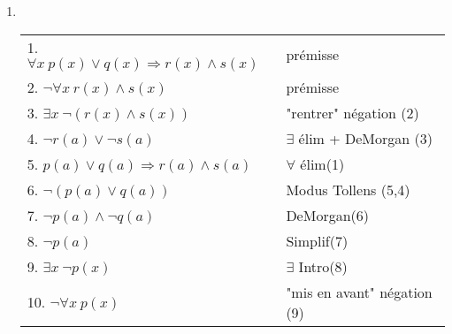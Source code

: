 {\begin{enumerate}
        \item \hspace{1pt}\\
            \begin{tabular}{|l|l|}
            \hline
            1. $ \forall x \ p(x) \lor q(x) \Rightarrow r(x) \land s(x) $ & prémisse \\
            2. $ \lnot \forall x \ r(x) \land s(x) $ & prémisse \\
            3. $ \exists x \ \neg  (r(x) \land s(x)) $ & "rentrer" négation (2) \\
            4. $ \neg r(a) \lor \neg s(a) $ & $\exists$ élim + DeMorgan (3) \\
            5. $ p(a) \lor q(a) \Rightarrow r(a) \land s(a) $ & $\forall$ élim(1) \\
            6. $ \neg (p(a) \lor q(a)) $ & Modus Tollens (5,4) \\
            7. $ \neg p(a) \land \neg q(a) $ & DeMorgan(6) \\
            8. $ \neg p(a) $ & Simplif(7)\\
            9. $ \exists x \ \neg p(x) $ & $\exists$ Intro(8) \\
            10. $ \neg \forall x \ p(x) $ & "mis en avant" négation (9)\\
            \hline
            \end{tabular}
        

\end{enumerate}}

